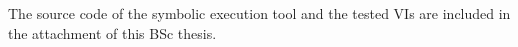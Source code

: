 \appendix
\chapter*{\fuggelek}
\setcounter{chapter}{\appendixnumber}





The source code of the symbolic execution tool and the tested VIs are included in the attachment of this BSc thesis. 


